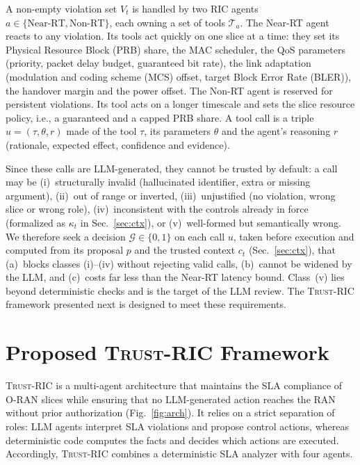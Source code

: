 \documentclass[conference]{IEEEtran}
\newcommand{\fw}{\textsc{Trust-RIC}}
\newcommand{\G}{\mathcal{G}}
\begin{document}
A non-empty violation set $V_t$ is handled by two RIC agents
$a\in\{\text{Near-RT},\text{Non-RT}\}$, each owning a set of tools
$\mathcal{T}_a$. The Near-RT agent reacts to any violation. Its tools act
quickly on one slice at a time: they set its Physical Resource Block (PRB)
share, the MAC scheduler, the QoS parameters (priority, packet delay budget,
guaranteed bit rate), the link adaptation (modulation and coding scheme (MCS)
offset, target Block Error Rate (BLER)), the handover margin and the power
offset. The Non-RT agent is reserved for persistent violations. Its tool acts
on a longer timescale and sets the slice resource policy, i.e., a guaranteed
and a capped PRB share. A tool call is a triple $u=(\tau,\theta,r)$ made of the
tool $\tau$, its parameters $\theta$ and the agent's reasoning $r$ (rationale,
expected effect, confidence and evidence).

Since these calls are LLM-generated, they cannot be trusted by default: a call
may be (i)~structurally invalid (hallucinated identifier, extra or missing
argument), (ii)~out of range or inverted, (iii)~unjustified (no violation,
wrong slice or wrong role), (iv)~inconsistent with the controls already in
force (formalized as $\kappa_t$ in Sec.~\ref{sec:ctx}), or (v)~well-formed but
semantically wrong. We therefore seek a decision $\G\in\{0,1\}$ on each call
$u$, taken before execution and computed from its proposal $p$ and the trusted
context $c_t$ (Sec.~\ref{sec:ctx}), that (a)~blocks classes (i)--(iv) without
rejecting valid calls, (b)~cannot be widened by the LLM, and (c)~costs far less
than the Near-RT latency bound. Class~(v) lies beyond deterministic checks and
is the target of the LLM review. The \fw{} framework presented next is designed
to meet these requirements.











\section{Proposed \fw{} Framework}\label{sec:arch}
\fw{} is a multi-agent architecture that maintains the SLA compliance of O-RAN slices while ensuring that no LLM-generated action reaches the RAN without prior authorization
(Fig.~\ref{fig:arch}). It relies on a strict separation of roles: LLM agents interpret SLA violations and propose control actions, whereas deterministic code computes the facts and decides which actions are executed. Accordingly, \fw{} combines a deterministic SLA analyzer with four agents.
\end{document}
